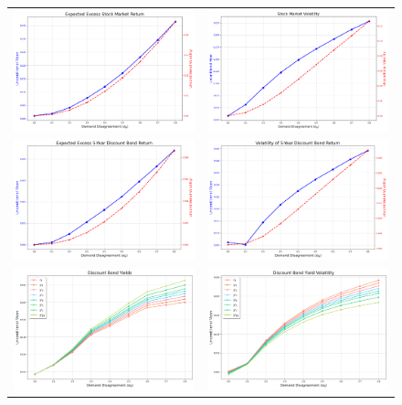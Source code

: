\documentclass[preprint,11pt,authoryear]{elsarticle}
\theoremstyle{plain}
\begin{document}
\begin{figure}[htbp]
\centering
\vspace{0.1in}
\begin{tabular}{cc}
\includegraphics[width=.4\textwidth]{figuresJFE/APUnconditionalExcessReturnsJFE.png} &
\includegraphics[width=.4\textwidth]{figuresJFE/APUnconditionalStockMarketVolatilityJFE.png} \\
\includegraphics[width=.4\textwidth]{figuresJFE/ExRBond5yearJFE.png} &
\includegraphics[width=.4\textwidth]{figuresJFE/BondVola5yearJFE.png} \\
\includegraphics[width=.4\textwidth]{figuresJFE/UnconditionalYieldsJFE.png} &
\includegraphics[width=.4\textwidth]{figuresJFE/UnconditionalYieldVolatilitiesJFE.png} \\ 

\end{tabular}
\end{figure}
\end{document}
